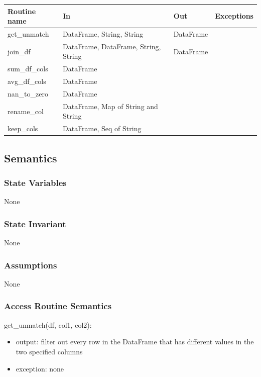 \documentclass[12pt]{article}
\begin{document}
\begin{tabular}{| l | l | l | p{5cm} |}
\hline
\textbf{Routine name} & \textbf{In} & \textbf{Out} & \textbf{Exceptions}\\
\hline
get\_unmatch & DataFrame, String, String & DataFrame & \\
\hline
join\_df & DataFrame, DataFrame, String, String & DataFrame & \\
\hline
sum\_df\_cols & DataFrame & & \\
\hline
avg\_df\_cols & DataFrame &  & \\
\hline
nan\_to\_zero & DataFrame&  & \\
\hline
rename\_col & DataFrame, Map of String and String &  & \\
\hline
keep\_cols & DataFrame, Seq of String &  & \\
\hline

\end{tabular}

\subsection* {Semantics}

\subsubsection* {State Variables}

None

\subsubsection* {State Invariant}

None

\subsubsection* {Assumptions}

None

\subsubsection* {Access Routine Semantics}

\noindent get\_unmatch(df, col1, col2):
\begin{itemize}
    \item output: filter out every row in the DataFrame that has different values in the two specified columns
    \item exception: none
\end{itemize}
\end{document}
